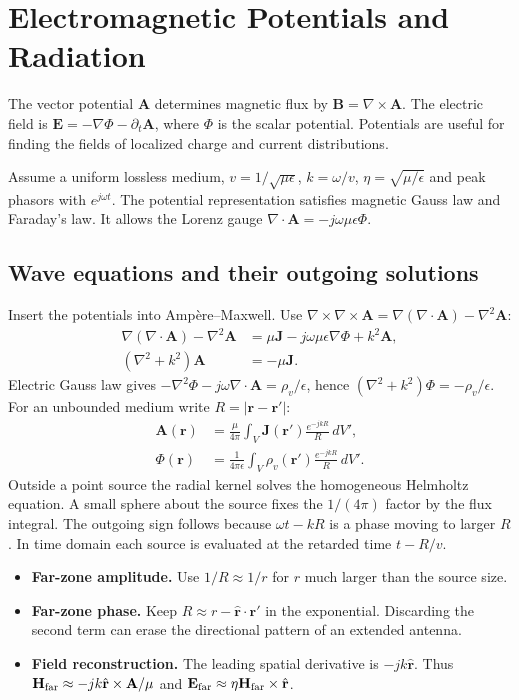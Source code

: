 \documentclass[12pt,a4paper]{article}
\begin{document}
\section{Electromagnetic Potentials and Radiation}
\begin{tcolorbox}[defbox,title={Scalar and vector potentials}]
The vector potential $\mathbf A$ determines magnetic flux by $\mathbf B=\nabla\times\mathbf A$. The electric field is $\mathbf E=-\nabla\Phi-\partial_t\mathbf A$, where $\Phi$ is the scalar potential. Potentials are useful for finding the fields of localized charge and current distributions.
\end{tcolorbox}

Assume a uniform lossless medium, $v=1/\sqrt{\mu\epsilon}$, $k=\omega/v$, $\eta=\sqrt{\mu/\epsilon}$ and peak phasors with $e^{j\omega t}$. The potential representation satisfies magnetic Gauss law and Faraday's law. It allows the Lorenz gauge $\nabla\cdot\mathbf A=-j\omega\mu\epsilon\Phi$.
\subsection{Wave equations and their outgoing solutions}
Insert the potentials into Amp\`ere--Maxwell. Use $\nabla\times\nabla\times\mathbf A=\nabla(\nabla\cdot\mathbf A)-\nabla^2\mathbf A$:
\[
\begin{aligned}
\nabla(\nabla\cdot\mathbf A)-\nabla^2\mathbf A
 &=\mu\mathbf J-j\omega\mu\epsilon\nabla\Phi+k^2\mathbf A,\\
(\nabla^2+k^2)\mathbf A&=-\mu\mathbf J.
\end{aligned}
\]
Electric Gauss law gives $-\nabla^2\Phi-j\omega\nabla\cdot\mathbf A=\rho_v/\epsilon$, hence $(\nabla^2+k^2)\Phi=-\rho_v/\epsilon$. For an unbounded medium write $R=|\mathbf r-\mathbf r'|$:
\[
\begin{aligned}
\mathbf A(\mathbf r)&=\frac{\mu}{4\pi}\int_V
     \mathbf J(\mathbf r')\frac{e^{-jkR}}{R}\,dV',\\
\Phi(\mathbf r)&=\frac{1}{4\pi\epsilon}\int_V
     \rho_v(\mathbf r')\frac{e^{-jkR}}{R}\,dV'.
\end{aligned}
\]
Outside a point source the radial kernel solves the homogeneous Helmholtz equation. A small sphere about the source fixes the $1/(4\pi)$ factor by the flux integral. The outgoing sign follows because $\omega t-kR$ is a phase moving to larger $R$. In time domain each source is evaluated at the retarded time $t-R/v$.
\begin{itemize}[leftmargin=*,itemsep=3pt]
\item \textbf{Far-zone amplitude.} Use $1/R\approx1/r$ for $r$ much larger than the source size.
\item \textbf{Far-zone phase.} Keep $R\approx r-\hat{\mathbf r}\cdot\mathbf r'$ in the exponential. Discarding the second term can erase the directional pattern of an extended antenna.
\item \textbf{Field reconstruction.} The leading spatial derivative is $-jk\hat{\mathbf r}$. Thus $\mathbf H_{\rm far}\approx-jk\hat{\mathbf r}\times\mathbf A/\mu$ and $\mathbf E_{\rm far}\approx\eta\mathbf H_{\rm far}\times\hat{\mathbf r}$.
\end{itemize}
\end{document}
